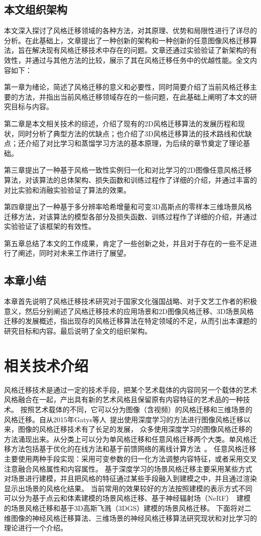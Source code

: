 \section{本文组织架构}
本文深入探讨了风格迁移领域的各种方法，对其原理、优势和局限性进行了详尽的分析。在此基础上，文章提出了一种创新的架构和一种创新的任意图像风格迁移算法，旨在解决现有风格迁移技术中存在的问题。文章还通过实验验证了新架构的有效性，并通过与其他方法的比较，展示了其在风格迁移任务中的优越性能。全文内容如下：
\par 第一章为绪论，简述了风格迁移的意义和必要性，同时简要介绍了当前风格迁移主要的方法，并指出当前风格迁移领域存在的一些问题，在此基础上阐明了本文的研究目标与内容。 
\par 第二章是本文相关技术的综述，介绍了现有的2D风格迁移算法的发展历程和现状，同时分析了典型方法的优缺点；也介绍了3D风格迁移算法的技术路线和优缺点；还介绍了对比学习和蒸馏学习方法的基本原理，为后续的章节奠定了理论基础。
\par 第三章提出了一种基于风格一致性实例归一化和对比学习的2D图像任意风格迁移算法，对该算法的总体架构、损失函数和训练过程作了详细的介绍，并通过丰富的对比实验和消融实验验证了算法的效果。
\par 第四章提出了一种基于多分辨率哈希增量和可变3D高斯点的零样本三维场景风格迁移方法，对该算法的模型各部分及损失函数、训练过程作了详细的介绍，并通过实验验证了该框架的有效性。
\par 第五章总结了本文的工作成果，肯定了一些创新之处，并且对于存在的一些不足进行了阐述，同时对未来工作进行了展望。

\section{本章小结}
本章首先说明了风格迁移技术研究对于国家文化强国战略、对于文艺工作者的积极意义，然后分别阐述了风格迁移技术的应用场景和2D图像风格迁移、3D场景风格迁移的发展概述，指出现存的风格迁移算法在特定领域的不足，从而引出本课题的研究目标和内容。最后说明了全文的组织架构。  

\chapter{相关技术介绍}
风格迁移技术是通过一定的技术手段，把某个艺术载体的内容同另一个载体的艺术风格融合在一起，产出具有新的艺术风格且保留原有内容特征的艺术品的一种技术。
按照艺术载体的不同，它可以分为图像（含视频）的风格迁移和三维场景的风格迁移。自从2015年Gatys等人~\cite{gatys2016image}提出使用深度学习的方法进行图像风格迁移以来，图像的风格迁移技术有了长足的发展，
众多使用深度学习的图像风格迁移的方法涌现出来。从分类上可以分为单风格迁移和任意风格迁移两个大类。单风格迁移方法包括基于优化的在线方法和基于前馈网络的离线计算方法~\cite{jing2019neural}。
任意风格迁移主要使用两种手段实现：采用可变参数的归一化方法调整内容特征，或者采用交叉注意融合风格属性和内容属性。
基于深度学习的场景风格迁移主要采用某些方式对场景进行建模，并且把风格的特征通过某些手段融入到建模之中，并且通过渲染显示出场景的风格化结果。
当前常用的效果较好的方法按照建模的表示方式不同可以分为基于点云和体素建模的场景风格迁移、基于神经辐射场（NeRF）~\cite{mildenhall2021nerf}建模的场景风格迁移和基于3D高斯飞溅（3DGS）建模的场景风格迁移。
下面将对二维图像的神经风格迁移算法、三维场景的神经风格迁移算法研究现状和对比学习的理论进行一个介绍。
